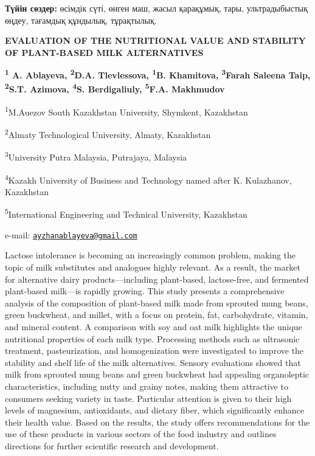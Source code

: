 {\bfseries Түйін сөздер:} өсімдік сүті, өнген маш, жасыл қарақұмық, тары,
ультрадыбыстық өңдеу, тағамдық құндылық, тұрақтылық.

\begin{articleheader}
{\bfseries EVALUATION OF THE NUTRITIONAL VALUE AND STABILITY OF PLANT-BASED
MILK ALTERNATIVES}

{\bfseries
\textsuperscript{1} A. Ablayeva\textsuperscript{\envelope },
\textsuperscript{2}D.A. Tlevlessova,
\textsuperscript{1}B. Khamitova,
\textsuperscript{3}Farah Saleena Taip,
\textsuperscript{2}S.T. Azimova,
\textsuperscript{4}S. Berdigaliuly,
\textsuperscript{5}F.A. Makhmudov
}
\end{articleheader}

\begin{affiliation}
\textsuperscript{1}M.Auezov South Kazakhstan University, Shymkent, Kazakhstan

\textsuperscript{2}Almaty Technological University, Almaty, Kazakhstan

\textsuperscript{3}University Putra Malaysia, Putrajaya, Malaysia

\textsuperscript{4}Kazakh University of Business and Technology named after K. Kulazhanov, Kazakhstan

\textsuperscript{5}International Engineering and Technical University, Kazakhstan

e-mail: \href{mailto:ayzhanablayeva@gmail.com}{\nolinkurl{ayzhanablayeva@gmail.com}}
\end{affiliation}

Lactose intolerance is becoming an increasingly common problem, making
the topic of milk substitutes and analogues highly relevant. As a
result, the market for alternative dairy products---including
plant-based, lactose-free, and fermented plant-based milk---is rapidly
growing. This study presents a comprehensive analysis of the composition
of plant-based milk made from sprouted mung beans, green buckwheat, and
millet, with a focus on protein, fat, carbohydrate, vitamin, and mineral
content. A comparison with soy and oat milk highlights the unique
nutritional properties of each milk type. Processing methods such as
ultrasonic treatment, pasteurization, and homogenization were
investigated to improve the stability and shelf life of the milk
alternatives. Sensory evaluations showed that milk from sprouted mung
beans and green buckwheat had appealing organoleptic characteristics,
including nutty and grainy notes, making them attractive to consumers
seeking variety in taste. Particular attention is given to their high
levels of magnesium, antioxidants, and dietary fiber, which
significantly enhance their health value. Based on the results, the
study offers recommendations for the use of these products in various
sectors of the food industry and outlines directions for further
scientific research and development.

